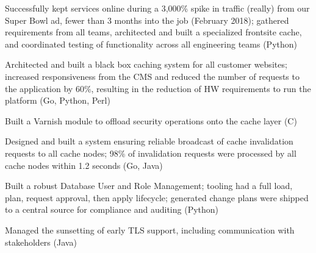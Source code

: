 \item Successfully kept services online during a 3,000\% spike in traffic (really) from our Super Bowl ad, fewer than 3
  months into the job (February 2018); gathered requirements from all teams, architected and built a specialized
  frontsite cache, and coordinated testing of functionality across all engineering teams (Python)

\item Architected and built a black box caching system for all customer websites; increased responsiveness from the CMS
  and reduced the number of requests to the application by 60\%, resulting in the reduction of HW requirements to run
  the platform (Go, Python, Perl)

\item Built a Varnish module to offload security operations onto the cache layer (C)

\item Designed and built a system ensuring reliable broadcast of cache invalidation requests to all cache nodes; 98\% of
  invalidation requests were processed by all cache nodes within 1.2 seconds (Go, Java)

\item Built a robust Database User and Role Management; tooling had a full load, plan, request approval, then apply
  lifecycle; generated change plans were shipped to a central source for compliance and auditing (Python)

\item Managed the sunsetting of early TLS support, including communication with stakeholders (Java)
